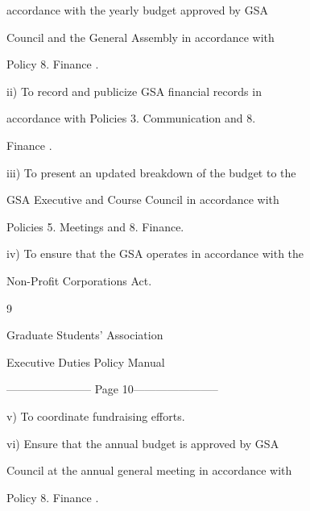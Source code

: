                   accordance  with  the  yearly  budget  approved  by  GSA  



                  Council  and  the  General  Assembly  in  accordance  with  



                  Policy 8. Finance .   

  

         ii)      To   record   and   publicize   GSA   financial   records   in  



                  accordance   with   Policies   3.   Communication   and   8.  



                  Finance .   

  

         iii)     To  present  an  updated  breakdown  of  the  budget  to  the  



                  GSA Executive and Course Council in accordance with  



                  Policies 5. Meetings and 8. Finance.   

  

         iv)      To ensure that the GSA operates in accordance with the  

                  Non-Profit Corporations Act.   

  



                                                  9  

                                      

                                    Graduate Students’ Association  

                                   Executive Duties Policy Manual  

  


----------------------- Page 10-----------------------

         v)       To coordinate fundraising efforts.   

  

         vi)      Ensure  that  the  annual  budget  is  approved  by  GSA  

                  Council at the annual general meeting in accordance with  

                  Policy 8. Finance .   

